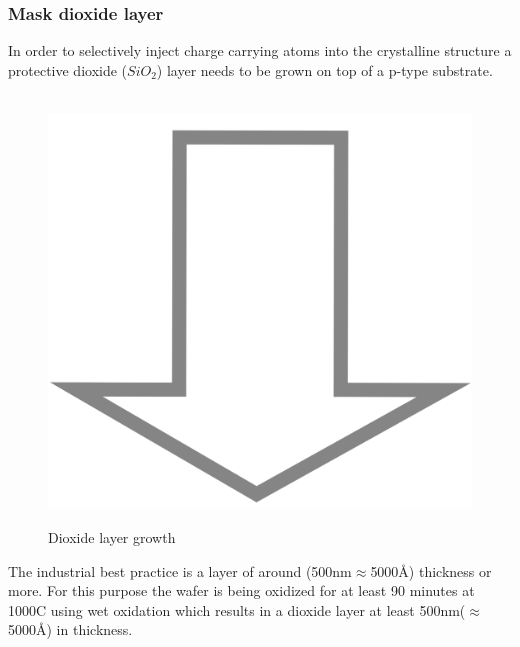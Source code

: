 \subsubsection{Mask dioxide layer}
In order to selectively inject charge carrying atoms into the crystalline structure a protective dioxide ($SiO_2$) layer needs to be grown on top of a p-type substrate.
\begin{figure}[H]
	\centering
	\begin{tikzpicture}[node distance = 3cm, auto, thick,scale=\CrossSectionOnly, every node/.style={transform shape}]
		
	\end{tikzpicture} \\
	\includegraphics[scale=0.01]{down_arrow.png} \\
	\begin{tikzpicture}[node distance = 3cm, auto, thick,scale=\CrossSectionOnly, every node/.style={transform shape}]
		
	\end{tikzpicture}
	\caption{Dioxide layer growth}
\end{figure}
The industrial best practice is a layer of around (500nm$\approx$5000\normalfont\AA) thickness or more.
For this purpose the wafer is being oxidized for at least 90 minutes at 1000\degree C using wet oxidation which results in a dioxide layer at least 500nm($\approx$5000\normalfont\AA) in thickness.

